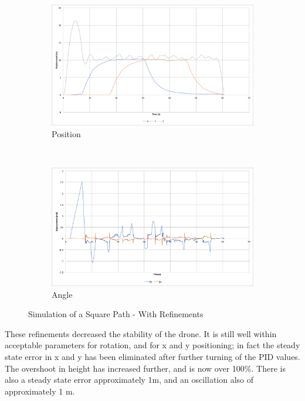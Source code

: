\documentclass[11pt]{article}
\begin{document}
\begin{figure}
    \begin{subfigure}{\textwidth}
        \includegraphics[width=\linewidth]{square_path_limited_servos}
        \caption{Position}
        \label{fig:square_path_limited_servos}
    \end{subfigure}\hspace*{\fill}
    \\
    \begin{subfigure}{\textwidth}
        \includegraphics[width=\linewidth]{square_path_limited_servos_angle}
        \caption{Angle}
        \label{fig:square_path_limited_servos_angle}
    \end{subfigure}

    \caption{Simulation of a Square Path - With Refinements}
    \label{fig:Square Path Refined}
\end{figure}

These refinements decreased the stability of the drone. It is still well within acceptable parameters for rotation, and for x and y positioning; in fact the steady state error in x and y has been eliminated after further turning of the PID values. The overshoot in height has increased further, and is now over 100\%. There is also a steady state error approximately 1m, and an oscillation also of approximately 1 m.
\label{height overshoot}
\end{document}
